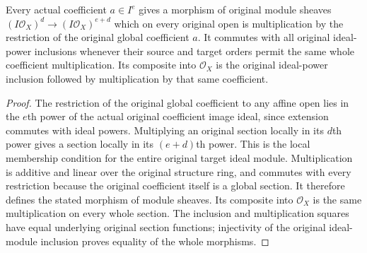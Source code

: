 \begin{lemma}
\label{lem:fibre-ideal-power-coefficient-multiplication}
\leanok
Every actual coefficient $a\in I^e$ gives a morphism of original
module sheaves $(I\mathcal O_X)^d\to(I\mathcal O_X)^{e+d}$ which on
every original open is multiplication by the restriction of the
original global coefficient $a$. It commutes with all original
ideal-power inclusions whenever their source and target orders permit
the same whole coefficient multiplication. Its composite into
$\mathcal O_X$ is the original ideal-power inclusion followed by
multiplication by that same coefficient.
\end{lemma}
\begin{proof}
The restriction of the original global coefficient to any affine
open lies in the $e$th power of the actual original coefficient image
ideal, since extension commutes with ideal powers. Multiplying an
original section locally in its $d$th power gives a section locally
in its $(e+d)$th power. This is the local membership condition for the
entire original target ideal module. Multiplication is additive and
linear over the original structure ring, and commutes with every
restriction because the original coefficient itself is a global
section. It therefore defines the stated morphism of module sheaves.
Its composite into $\mathcal O_X$ is the same multiplication on every
whole section. The inclusion and multiplication squares have equal
underlying original section functions; injectivity of the original
ideal-module inclusion proves equality of the whole morphisms.
\end{proof}
